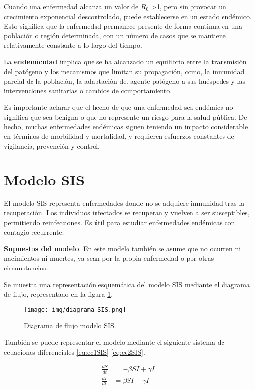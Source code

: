 Cuando una enfermedad alcanza un valor de $R_0$ >1, pero sin provocar un crecimiento exponencial descontrolado, puede establecerse en un estado endémico. Esto significa que la enfermedad permanece presente de forma continua en una población o región determinada, con un número de casos que se mantiene relativamente constante a lo largo del tiempo.

La \textbf{endemicidad} implica que se ha alcanzado un equilibrio entre la transmisión del patógeno y los mecanismos que limitan su propagación, como, la inmunidad parcial de la población, la adaptación del agente patógeno a sus huéspedes y las intervenciones sanitarias o cambios de comportamiento.

Es importante aclarar que el hecho de que una enfermedad sea endémica no significa que sea benigna o que no represente un riesgo para la salud pública. De hecho, muchas enfermedades endémicas siguen teniendo un impacto considerable en términos de morbilidad y mortalidad, y requieren esfuerzos constantes de vigilancia, prevención y control.

\section{Modelo SIS}
El modelo SIS representa enfermedades donde no se adquiere inmunidad tras la recuperación. Los individuos infectados se recuperan y vuelven a ser susceptibles, permitiendo reinfecciones. Es útil para estudiar enfermedades endémicas con contagio recurrente.

\textbf{Supuestos del modelo}. En este modelo también se asume que no ocurren ni nacimientos ni muertes, ya sean por la propia enfermedad o por otras circunstancias.

Se muestra una representación esquemática del modelo SIS mediante el diagrama de flujo, representado en la figura \ref{fig:diagrama SIS}.
\begin{figure}[H]
    \centering
    \texttt{[image: img/diagrama\_SIS.png]}
    \caption{Diagrama de flujo modelo SIS.}
    \label{fig:diagrama SIS}
  
\end{figure}

También se puede representar el modelo mediante el siguiente sistema de ecuaciones diferenciales \eqref{eq:ec1SIS} \eqref{eq:ec2SIS}.

\begin{align}
\frac{dS}{dt} &= -\beta SI + \gamma I \label{eq:ec1SIS} \\
\frac{dI}{dt} &= \beta SI - \gamma I \label{eq:ec2SIS}
\end{align}

